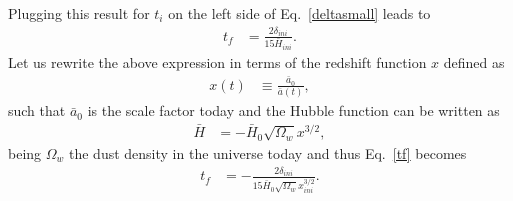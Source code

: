 \documentclass[a4paper,11pt]{article}
\begin{document}
Plugging this result for $t_i$ on the left side of Eq.~\eqref{deltasmall} leads to
\begin{align}
\label{tf}
    t_f &= \frac{2\delta_{ini}}{15\bar{H}_{ini}}
.\end{align}
Let us rewrite the above expression in terms of the redshift function $x$ defined as
\begin{align}
    x(t) &\equiv  \frac{\bar{a}_0}{\bar{a}(t)}
,\end{align}
such that $\bar{a}_0$ is the scale factor today and the Hubble function can be written as
\begin{align}
\label{Hx}
    \bar{H}&= -\bar{H}_0\sqrt{\Omega_w} x^{3/2}
,\end{align} 
being $\Omega_w$ the dust density in the universe today and thus Eq.~\eqref{tf} becomes
\begin{align}
\label{tfx}
     t_f &= -\frac{2 \delta_{ini}}{15\bar{H}_0 \sqrt{\Omega_w} x_{ini}^{3/2}}
.\end{align}
\end{document}
